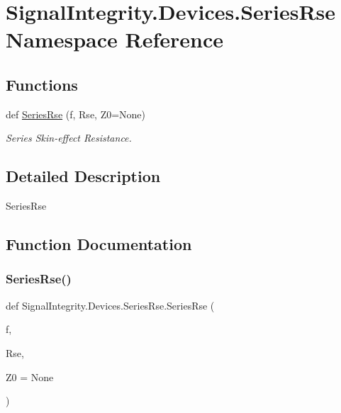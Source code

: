 \hypertarget{namespaceSignalIntegrity_1_1Devices_1_1SeriesRse}{}\section{Signal\+Integrity.\+Devices.\+Series\+Rse Namespace Reference}
\label{namespaceSignalIntegrity_1_1Devices_1_1SeriesRse}
\subsection*{Functions}
\begin{DoxyCompactItemize}
\item 
def \hyperlink{namespaceSignalIntegrity_1_1Devices_1_1SeriesRse_aedcf5007f2c1b42fcd25ef917b9a4945}{Series\+Rse} (f, Rse, Z0=None)
\begin{DoxyCompactList}\small\item\em Series Skin-\/effect Resistance. \end{DoxyCompactList}\end{DoxyCompactItemize}


\subsection{Detailed Description}
\begin{DoxyVerb}SeriesRse\end{DoxyVerb}
 

\subsection{Function Documentation}
\mbox{\label{namespaceSignalIntegrity_1_1Devices_1_1SeriesRse_aedcf5007f2c1b42fcd25ef917b9a4945}} 
\subsubsection{\texorpdfstring{Series\+Rse()}{SeriesRse()}}
{\footnotesize\ttfamily def Signal\+Integrity.\+Devices.\+Series\+Rse.\+Series\+Rse (\begin{DoxyParamCaption}\item[{}]{f,  }\item[{}]{Rse,  }\item[{}]{Z0 = {\ttfamily None} }\end{DoxyParamCaption})}




